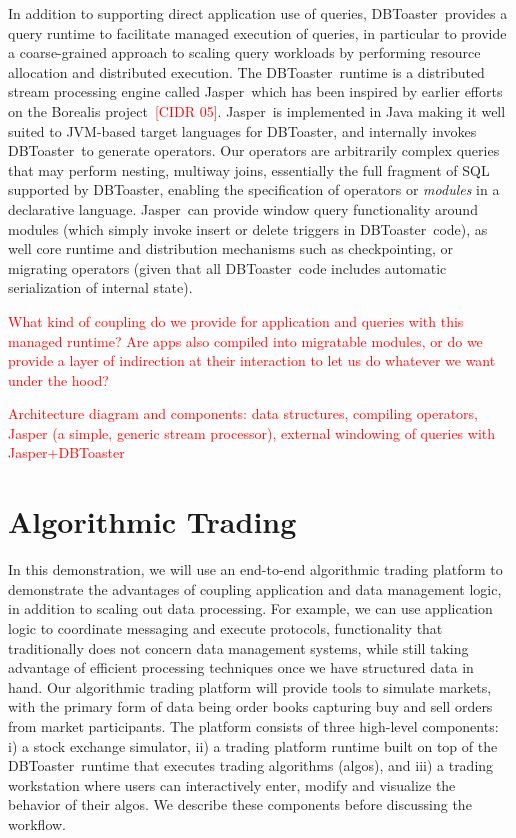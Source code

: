 \documentclass{vldb}
\newcommand{\tinysection}[1]{\noindent{\bf #1.}}
\newcommand{\todo}[1]{\textcolor{red}{#1}}
\newcommand{\compiler}{DBToaster}
\newcommand{\spe}{Jasper}
\begin{document}
\tinysection{The DBToaster Runtime}
In addition to supporting direct application use of queries, \compiler\ provides
a query runtime to facilitate managed execution of queries, in particular to
provide a coarse-grained approach to scaling query workloads by performing
resource allocation and distributed execution. The \compiler\ runtime is a
distributed stream processing engine called \spe\ which has been inspired by
earlier efforts on the Borealis project~\todo{[CIDR 05]}. \spe\ is
implemented in Java making it well suited to JVM-based target
languages for \compiler, and internally invokes \compiler\ to generate
operators. Our operators are arbitrarily complex queries that may
perform nesting, multiway joins, essentially the full fragment of SQL
supported by \compiler, enabling the specification of operators or
\textit{modules} in a declarative language. \spe\ can provide window query
functionality around modules (which simply invoke insert or delete triggers in
\compiler\ code), as well core runtime and distribution mechanisms such as
checkpointing, or migrating operators (given that all \compiler\ code includes
automatic serialization of internal state).

\todo{What kind of coupling do we provide for application and queries with this
managed runtime? Are apps also compiled into migratable modules, or do we
provide a layer of indirection at their interaction to let us do whatever we
want under the hood?}

\todo{Architecture diagram and components: data structures, compiling
operators, Jasper (a simple, generic stream processor), external windowing of
queries with Jasper+DBToaster}


\section{Algorithmic Trading}
In this demonstration, we will use an end-to-end algorithmic trading platform to
demonstrate the advantages of coupling application and data management logic, in
addition to scaling out data processing. For example, we can use application
logic to coordinate messaging and execute protocols, functionality that
traditionally does not concern data management systems, while still taking
advantage of efficient processing techniques once we have structured data in
hand. Our algorithmic trading platform will provide tools to simulate markets,
with the primary form of data being order books capturing buy and sell orders
from market participants. The platform consists of three high-level components:
i) a stock exchange simulator, ii) a trading platform runtime built on top of
the \compiler\ runtime that executes trading algorithms (algos), and iii) a
trading workstation where users can interactively enter, modify and visualize
the behavior of their algos. We describe these components before discussing the
workflow.
\end{document}
